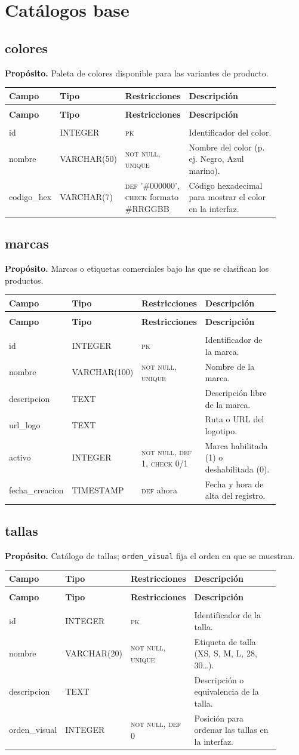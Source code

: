 \documentclass[11pt]{article}
\makeatletter
\newenvironment{campos}{%
  \par\footnotesize
  \setlength{\LTpre}{0.3ex}\setlength{\LTpost}{0.6ex}
  \begin{longtable}{@{}>{\ttfamily}p{0.165\linewidth} >{\ttfamily}p{0.150\linewidth} p{0.205\linewidth} >{\raggedright\arraybackslash}p{0.385\linewidth}@{}}
  \toprule
  \normalfont\bfseries Campo & \normalfont\bfseries Tipo & \normalfont\bfseries Restricciones & \normalfont\bfseries Descripción \\
  \midrule \endfirsthead
  \multicolumn{4}{@{}l}{\footnotesize\itshape \dots\ continuación}\\[0.3ex]
  \toprule
  \normalfont\bfseries Campo & \normalfont\bfseries Tipo & \normalfont\bfseries Restricciones & \normalfont\bfseries Descripción \\
  \midrule \endhead
  \midrule \multicolumn{4}{r@{}}{\footnotesize\itshape continúa en la siguiente página}\\ \endfoot
  \bottomrule \endlastfoot
}{%
  \end{longtable}\par
}
\newcommand{\proposito}[1]{\par\vspace{0.2ex}\noindent\colorbox{brandlight}{\parbox{\dimexpr\linewidth-2\fboxsep}{\small\textbf{Propósito.} #1}}\par\vspace{0.8ex}}
\newcommand{\pk}{\textsc{pk}}
\newcommand{\nn}{\textsc{not null}}
\newcommand{\uq}{\textsc{unique}}
\makeatother
\begin{document}
\section{Catálogos base}

\subsection{colores}
\proposito{Paleta de colores disponible para las variantes de producto.}
\begin{campos}
id          & INTEGER       & \pk{}                       & Identificador del color. \\
nombre      & VARCHAR(50)   & \nn, \uq                    & Nombre del color (p. ej. Negro, Azul marino). \\
codigo\_hex & VARCHAR(7)    & \textsc{def} '\#000000', \textsc{check} formato \#RRGGBB & Código hexadecimal para mostrar el color en la interfaz. \\
\end{campos}

\subsection{marcas}
\proposito{Marcas o etiquetas comerciales bajo las que se clasifican los productos.}
\begin{campos}
id             & INTEGER    & \pk{}                & Identificador de la marca. \\
nombre         & VARCHAR(100) & \nn, \uq           & Nombre de la marca. \\
descripcion    & TEXT       &                      & Descripción libre de la marca. \\
url\_logo      & TEXT       &                      & Ruta o URL del logotipo. \\
activo         & INTEGER    & \nn, \textsc{def} 1, \textsc{check} 0/1 & Marca habilitada (1) o deshabilitada (0). \\
fecha\_creacion & TIMESTAMP & \textsc{def} ahora   & Fecha y hora de alta del registro. \\
\end{campos}

\subsection{tallas}
\proposito{Catálogo de tallas; \texttt{orden\_visual} fija el orden en que se muestran.}
\begin{campos}
id            & INTEGER     & \pk{}              & Identificador de la talla. \\
nombre        & VARCHAR(20) & \nn, \uq           & Etiqueta de talla (XS, S, M, L, 28, 30\dots). \\
descripcion   & TEXT        &                    & Descripción o equivalencia de la talla. \\
orden\_visual & INTEGER     & \nn, \textsc{def} 0 & Posición para ordenar las tallas en la interfaz. \\
\end{campos}
\end{document}
